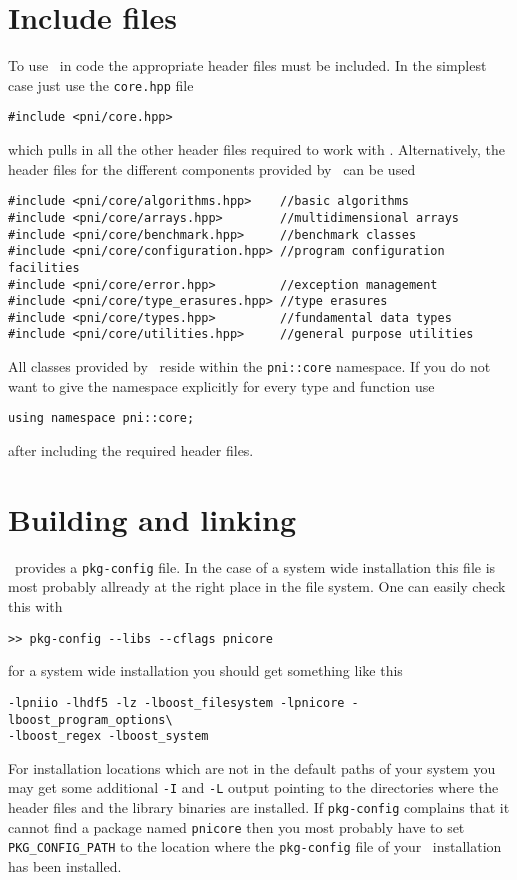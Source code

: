 \section{Include files}

To use \libpnicore\ in code the appropriate header files must be included. In
the simplest case just use the {\tt core.hpp} file 
\begin{verbatim}
#include <pni/core.hpp>
\end{verbatim}
which pulls in all the other header files required to work with \libpnicore.
Alternatively, the header files for the different components provided by
\libpnicore\ can be used
\begin{verbatim}
#include <pni/core/algorithms.hpp>    //basic algorithms
#include <pni/core/arrays.hpp>        //multidimensional arrays
#include <pni/core/benchmark.hpp>     //benchmark classes
#include <pni/core/configuration.hpp> //program configuration facilities
#include <pni/core/error.hpp>         //exception management
#include <pni/core/type_erasures.hpp> //type erasures
#include <pni/core/types.hpp>         //fundamental data types
#include <pni/core/utilities.hpp>     //general purpose utilities
\end{verbatim}
All classes provided by \libpnicore\ reside within the {\tt pni::core}
namespace. If you do not want to give the namespace explicitly for every type
and function use
\begin{verbatim}
using namespace pni::core;
\end{verbatim}
after including the required header files.

\section{Building and linking}
\libpnicore\ provides a {\tt pkg-config} file. In the case of a system wide
installation this file is most probably allready at the right place in the file
system. One can easily check this with 
\begin{verbatim}
>> pkg-config --libs --cflags pnicore 
\end{verbatim}
for a system wide installation you should get something like this
\begin{verbatim}
-lpniio -lhdf5 -lz -lboost_filesystem -lpnicore -lboost_program_options\ 
-lboost_regex -lboost_system 
\end{verbatim}
For installation locations which are not in the default paths of your system you
may get some additional {\tt -I} and {\tt -L} output pointing to the directories
where the header files and the library binaries are installed.
If {\tt pkg-config} complains that it cannot find a package named {\tt pnicore}
then you most probably have to set {\tt PKG\_CONFIG\_PATH} to the location where 
the {\tt pkg-config} file of your \libpnicore\ installation has been installed. 


